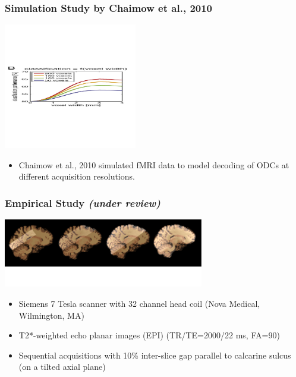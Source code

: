 \documentclass{beamer}
\begin{document}
  \begin{frame}
    \frametitle{Simulation Study by Chaimow et al., 2010}
        \begin{center}
            \includegraphics[height=5.5cm]{pics/shmuel_model}
        \end{center}
        \begin{itemize}
         \item Chaimow et al., 2010 simulated fMRI data to model decoding 
         of ODCs at different acquisition resolutions.
        \end{itemize}  
    \end{frame}

  \begin{frame}
    \frametitle{Empirical Study \textit{(under review)}}
        \begin{center}
            \includegraphics[height=3cm]{pics/acquisition}
        \end{center}
        \begin{itemize}
         \item Siemens 7 Tesla scanner with 32 channel head coil (Nova Medical, Wilmington, MA)
         \item T2*-weighted echo planar images (EPI) (TR/TE=2000/22 ms, FA=90\textdegree)
         \item Sequential acquisitions with 10\% inter-slice gap parallel to calcarine sulcus (on a tilted 
         axial plane)
        \end{itemize}  
    \end{frame}  
    
\end{document}
